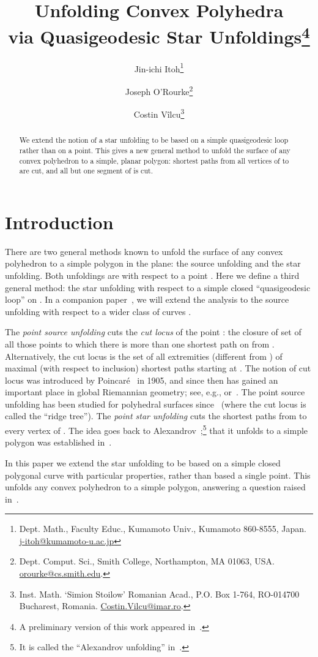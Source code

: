 \pdfoutput=1  \documentclass[]{article}
\title{
Unfolding Convex Polyhedra \\ 
via
Quasigeodesic Star Unfoldings\footnote{
   A preliminary version of this work appeared
   in~\cite{iov-ucpq-07,iov-ucpq-07a}.
}
}
\author{Jin-ichi Itoh\thanks{Dept. Math.,
	Faculty Educ., Kumamoto Univ.,
	Kumamoto 860-8555, Japan.
    \protect\url{j-itoh@kumamoto-u.ac.jp}}
\and
Joseph O'Rourke\thanks{Dept. Comput. Sci., Smith College, Northampton, MA
      01063, USA.
      \protect\url{orourke@cs.smith.edu}.}
\and
Costin V\^{i}lcu\thanks{Inst. Math. `Simion Stoilow' Romanian Acad.,
P.O. Box 1-764,
RO-014700 Bucharest, Romania.
    \protect\url{Costin.Vilcu@imar.ro}.}
}
\begin{document}
\maketitle

\begin{abstract}
We extend the notion of a star unfolding to be based on
a simple quasigeodesic loop  rather than on a point.
This gives a new general method to unfold the surface of any convex polyhedron
 to a simple, planar polygon: shortest paths
from all vertices of  to  are cut, and all but one
segment of  is cut.
\end{abstract}

\section{Introduction}

There are two general methods known to unfold the surface  
of any convex polyhedron
to a simple polygon in the plane:
the source unfolding and the star unfolding.
Both unfoldings are with respect to a point .
Here we define a third general method:
the star unfolding
with respect to a
simple closed ``quasigeodesic loop''  on .
In a companion paper~\cite{iov-ucpqsu-08b}, we 
will extend the analysis
to the source unfolding with respect to a wider class of curves .


The \emph{point source unfolding} cuts the \emph{cut locus} of
the point :
the closure of set of all those points  to which there is
more than one shortest path on  from .
Alternatively, the cut locus is the set of all extremities
(different from ) of maximal (with respect to inclusion) shortest paths
starting at .
The notion of cut locus was introduced by 
Poincar\'e~\cite{p-lgsc-1905}
in 1905, and since then has gained an
important place in global Riemannian geometry; see, e.g., 
\cite{k-ccl-67} or~\cite{s-rg-96}.
The point source unfolding has been studied
for polyhedral surfaces since~\cite{ss-spps-86} (where the cut locus is called the ``ridge tree'').
The \emph{point star unfolding} cuts the shortest paths from  to every
vertex of .
The idea goes back to Alexandrov~\cite[p.~181]{a-kp-48};\footnote{
   It is called the ``Alexandrov unfolding'' in~\cite{mp-mccpc-05}.
}
that it unfolds  to a simple polygon was established
in~\cite{ao-nsu-92}.

In this paper we extend the star unfolding to be based on a
simple closed polygonal curve  with particular properties,
rather than based a single point.
This unfolds any convex polyhedron to a simple polygon,
answering a question
raised in~\cite[p.~307]{do-gfalop-07}.
\end{document}
